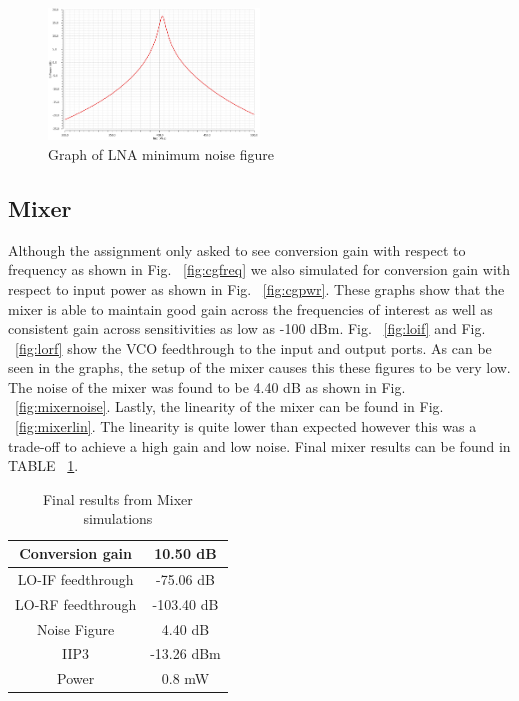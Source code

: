 \begin{figure}[h]
   \centering
    \includegraphics[width=0.5\textwidth]{figures/s21.png}
    \caption{Graph of LNA minimum noise figure}
    \label{fig:lnanoisemin}
\end{figure}

\subsection{Mixer}
Although the assignment only asked to see conversion gain with respect to frequency as shown in Fig. ~\ref{fig:cgfreq} we also simulated for conversion gain with respect to input power as shown in Fig. ~\ref{fig:cgpwr}. These graphs show that the mixer is able to maintain good gain across the frequencies of interest as well as consistent gain across sensitivities as low as -100 dBm. Fig. ~\ref{fig:loif} and Fig. ~\ref{fig:lorf} show the VCO feedthrough to the input and output ports. As can be seen in the graphs, the setup of the mixer causes this these figures to be very low. The noise of the mixer was found to be 4.40 dB as shown in Fig. ~\ref{fig:mixernoise}. Lastly, the linearity of the mixer can be found in Fig. ~\ref{fig:mixerlin}. The linearity is quite lower than expected however this was a trade-off to achieve a high gain and low noise. Final mixer results can be found in TABLE ~\ref{tab:mixerresults}.

\begin{table}[h]
\begin{center}
	\begin{tabular}{ |c | c | }
 		\hline                      
  		Conversion gain &  10.50 dB\\ \hline
  		LO-IF feedthrough &  -75.06 dB\\ \hline
  		LO-RF feedthrough & -103.40 dB\\ \hline
		Noise Figure &  4.40 dB\\ \hline
		IIP3 & -13.26 dBm\\ \hline
		Power & 0.8 mW \\ 
  		\hline  
	\end{tabular}

\end{center}
\caption{Final results from Mixer simulations}
\label{tab:mixerresults}
\end{table}

